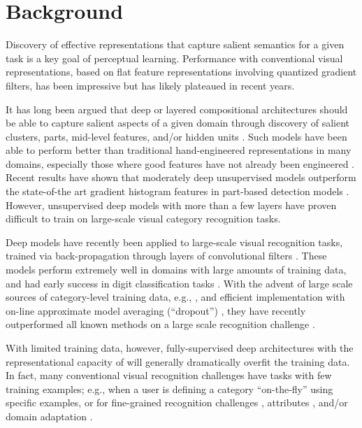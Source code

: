 
\section{Background}
Discovery of effective representations that capture salient semantics
for a given task is a key goal of perceptual learning.  Performance
with conventional visual representations, based on flat feature
representations involving quantized gradient filters, has been
impressive but has likely plateaued in recent years.

It has long been argued that deep or layered compositional
architectures should be able to capture salient aspects of a given
domain through discovery of salient clusters, parts, mid-level
features, and/or hidden units
\cite{autoencoders,fidler,yuille2007,efros2012,supervision}. Such models have
been able to perform better than traditional hand-engineered
representations in many domains, especially those where good features
have not already been engineered \cite{ngunsupervised}.  Recent
results have shown that moderately deep unsupervised models outperform
the state-of-the art gradient histogram features in part-based
detection models \cite{hsc}. However, unsupervised deep models with
more than a few layers have proven difficult to train on large-scale visual category recognition tasks.

Deep models have recently been applied to large-scale
visual recognition tasks, trained via back-propagation through layers of convolutional filters
\cite{lecun89}. These models perform extremely well in domains with
large amounts of training data, and had early success in digit
classification tasks \cite{lenet}. With the advent of large scale
sources of category-level training data, e.g., \cite{imagenet_cvpr09}, and
efficient implementation with on-line approximate model averaging
(``dropout'') \cite{supervision}, they have recently outperformed all
known methods on a large scale recognition challenge
\cite{ilsvrc2012}.


With limited training data, however, fully-supervised deep
architectures with the representational capacity of \cite{supervision}
will generally dramatically overfit the training data.
In fact, many conventional visual recognition challenges have tasks with few
training examples; e.g., when a user is defining a category
``on-the-fly'' using specific examples, or for fine-grained
recognition challenges \cite{birds}, attributes \cite{attribute}, and/or
domain adaptation \cite{eccv_saenko}.

